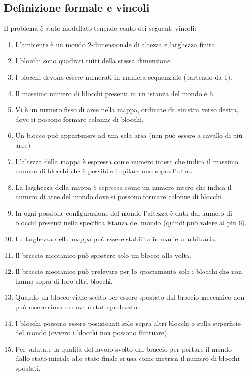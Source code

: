 \documentclass{article}
\begin{document}
	\subsection{Definizione formale e vincoli}
	Il problema è stato modellato tenendo conto dei seguenti vincoli:
	\begin{enumerate}
		\item L'ambiente è un mondo 2-dimensionale di altezza e larghezza finita.
		\item I blocchi sono quadrati tutti della stessa dimensione.
		\item I blocchi devono essere numerati in maniera sequenziale (partendo da 1).
		\item Il massimo numero di blocchi presenti in un istanza del mondo è 6.
		\item Vi è un numero fisso di aree nella mappa, ordinate da sinistra verso destra, dove si possono formare colonne di blocchi.
		\item Un blocco può appartenere ad una sola area (non può essere a cavallo di più aree).
		\item L'altezza della mappa è espressa come numero intero che indica il massimo numero di blocchi che è possibile impilare uno sopra l'altro.
		\item La larghezza della mappa è espressa come un numero intero che indica il numero di aree del mondo dove si possono formare colonne di blocchi.
		\item In ogni possibile configurazione del mondo l'altezza è data dal numero di blocchi presenti nella specifica istanza del mondo (quindi può valere al più 6).
		\item La larghezza della mappa può essere stabilita in maniera arbitraria.
		\item Il braccio meccanico può spostare solo un blocco alla volta.
		\item Il braccio meccanico può prelevare per lo spostamento solo i blocchi che non hanno sopra di loro altri blocchi.
		\item Quando un blocco viene scelto per essere spostato dal braccio meccanico non può essere rimesso dove è stato prelevato.
		\item I blocchi possono essere posizionati solo sopra altri blocchi o sulla superficie del mondo (ovvero i blocchi non possono fluttuare).
		\item Per valutare la qualità del lavoro svolto dal braccio per portare il mondo dallo stato iniziale allo stato finale si usa come metrica il numero di blocchi spostati.
	\end{enumerate}
\end{document}
